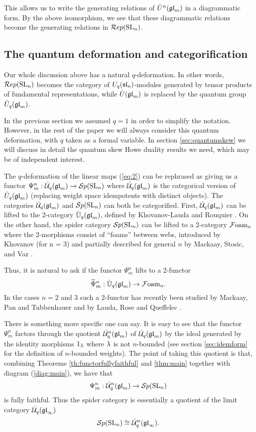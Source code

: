 \documentclass[11pt]{amsart}
\begin{document}
This allows us to write the generating relations of $\dot{U}^n(\gl_m) $ in a diagrammatic form. By the above isomorphism, we see that these diagrammatic relations become the generating relations in $\Rep(\SL_n)$.

\subsection{The quantum deformation and categorification}

Our whole discussion above has a natural $q$-deformation. In other words, $\Rep(\SL_n)$ becomes the category of $U_q(\sl_n)$-modules generated by tensor products of fundamental representations, while ${\dot U}(\gl_m)$ is replaced by the quantum group $\dalg(\gl_m)$.

In the previous section we assumed $q=1$ in order to simplify the notation. However, in the rest of the paper we will always consider this quantum deformation, with $ q $ taken as a formal variable. In section \ref{sec:quantumskew} we will discuss in detail the quantum skew Howe duality results we need, which may be of independent interest.

The $q$-deformation of the linear maps (\ref{eq:2}) can be rephrased as giving us a functor $ \Psi_m^n : \dU(\gl_m) \rightarrow \Sp(\SL_n) $ where $ \dU(\gl_m) $ is the categorical version of $ \dalg(\gl_m) $ (replacing weight space idempotents with distinct objects).  The categories $\dU(\gl_m)$ and $\Sp(\SL_n)$ can both be categorified. First, $\dU(\gl_m)$ can be lifted to the 2-category $\dot{\mathbb{U}}_q(\gl_m)$, defined by Khovanov-Lauda \cite{MR2628852} and Rouquier \cite{0812.5023}.  On the other hand, the spider category $\Sp(\SL_n)$ can be lifted to a 2-category $\Foam_n$ where the 2-morphisms consist of ``foams'' between webs, introduced by Khovanov \cite{MR2100691} (for n = 3) and partially described for general $n$ by Mackaay, Stosic, and Vaz \cite{MR2491657}.

Thus, it is natural to ask if the functor $ \Psi_m^n $ lifts to a 2-functor
$$\widetilde{\Psi}_m^n: \dot{\mathbb{U}}_q(\gl_m) \rightarrow \Foam_n.$$
In the cases $n=2$ and $3$ such a 2-functor has recently been studied by Mackaay, Pan and Tubbenhauer \cite{1206.2118} and by Lauda, Rose and Queffelec \cite{1212.6076}.

There is something more specific one can say. It is easy to see that the functor $\Psi_m^n$ factors through the quotient $\dU^n(\gl_m)$ of $\dU(\gl_m)$ by the ideal generated by the identity morphisms $1_\l$ where $\l$ is not $n$-bounded (see section \ref{sec:idemform} for the definition of $n$-bounded weights). The point of taking this quotient is that, combining Theorems \ref{th:functorfullyfaithful} and \ref{thm:main} together with diagram (\ref{diag:main}), we have that 
$$\Psi_m^n: \dU^n(\gl_m) \rightarrow \Sp(\SL_n)$$
is fully faithful. Thus the spider category is essentially a quotient of the limit category $\dU(\gl_\infty)$
$$\Sp(\SL_n) \iso \dU^n(\gl_\infty).$$
\end{document}
